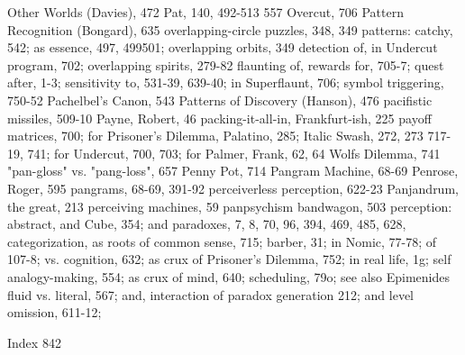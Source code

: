 Other Worlds (Davies), 472                         Pat, 140, 492-513 557
Overcut, 706                                       Pattern Recognition (Bongard), 635
overlapping-circle puzzles, 348, 349               patterns: catchy, 542; as essence, 497, 499501;
overlapping orbits, 349                             detection of, in Undercut program, 702;
overlapping spirits, 279-82                         flaunting of, rewards for, 705-7; quest after,
                                                    1-3; sensitivity to, 531-39, 639-40; in
                                                    Superflaunt, 706; symbol triggering, 750-52
Pachelbel's Canon, 543                             Patterns of Discovery (Hanson), 476
pacifistic missiles, 509-10                        Payne, Robert, 46
packing-it-all-in, Frankfurt-ish, 225              payoff matrices, 700; for Prisoner's Dilemma,
Palatino, 285; Italic Swash, 272, 273               717-19, 741; for Undercut, 700, 703; for
Palmer, Frank, 62, 64                               Wolfs Dilemma, 741
"pan-gloss" vs. "pang-loss", 657                   Penny Pot, 714
Pangram Machine, 68-69                             Penrose, Roger, 595
pangrams, 68-69, 391-92                            perceiverless perception, 622-23
Panjandrum, the great, 213                         perceiving machines, 59
panpsychism bandwagon, 503                         perception: abstract, and Cube, 354; and
paradoxes, 7, 8, 70, 96, 394, 469, 485, 628,        categorization, as roots of common sense,
 715; barber, 31; in Nomic, 77-78; of               107-8; vs. cognition, 632; as crux of
 Prisoner's Dilemma, 752; in real life, 1g; self    analogy-making, 554; as crux of mind, 640;
 scheduling, 79o; see also Epimenides               fluid vs. literal, 567; and, interaction of
 paradox                                            generation 212; and level omission, 611-12;

 Index                                                                                       842

